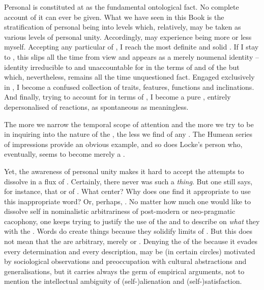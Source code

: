 
\pa Personal  is constituted at  as the fundamental
ontological fact.  No complete  account of it can ever be given.
What we have seen in this Book is the stratification of personal being into
levels which, relatively, may be taken as various levels of personal unity.
Accordingly,  may experience being more or less {myself}.  Accepting
  any particular  of , {I} reach
the most definite and solid .  If {I} stay  to
, this  slips all the time from  view and appears as
a merely noumenal identity -- identity irreducible to and unaccountable for in
the  terms of  and of the  but
which, nevertheless, remains all the time unquestioned fact.  Engaged
exclusively in , {I} become a confused collection of traits,
features, functions and inclinations.  And finally, trying to account for
 in terms of , {I} become a pure , entirely
depersonalised  of  reactions, as spontaneous as
meaningless.

\pa The more we narrow the temporal scope of attention and the more
 we try to be in inquiring into the nature of the ,
the less we find of any .  The Humean series of impressions provide
an obvious example, and so does Locke's person who, eventually, seems to become
merely a .

Yet, the awareness of personal unity makes it hard to accept the attempts to
dissolve  in a flux of .  Certainly,
there never was such a {\em thing}.  But one still says, for instance, that
 or of . What center? Why does one find it appropriate
to use this inappropriate word? Or, perhaps, . No matter how much one would like to dissolve self in
nominalistic arbitrariness of post-modern or neo-pragmatic cacophony, one keeps
trying to justify the use of the  and to describe on {\em what}
they  with the . Words do create things
because they solidify limits of . But this does not mean that
the  are arbitrary, merely  or .
Denying the  of the  because it evades every determination
and every  description, may be (in certain circles) motivated by
sociological observations and preoccupation with cultural abstractions and
generalisations, but it carries always the germ of empirical arguments, not to
mention the intellectual ambiguity of (self-)alienation and (self-)satisfaction.

